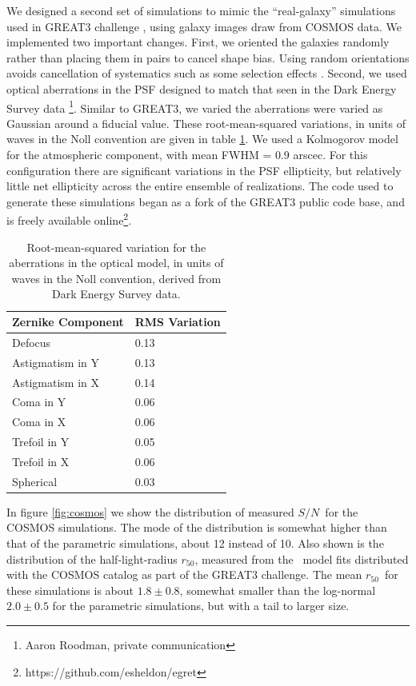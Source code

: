 \documentclass[usegraphicx,usenatbib]{mn2e}
\newcommand{\snr}{$S/N$}
\newcommand{\hlr}{$r_{50}$}
\begin{document}
We designed a second set of simulations to mimic the ``real-galaxy'' simulations
used in GREAT3 challenge \citep{great3}, using galaxy images draw from COSMOS
data.  We implemented two important changes.  First, we oriented the galaxies
randomly rather than placing them in pairs to cancel shape bias.  Using random
orientations avoids cancellation of systematics such as some selection effects
\citep{DESSVShear}.  Second, we used optical aberrations in the PSF designed to
match that seen in the Dark Energy Survey data \footnote{Aaron Roodman, private
communication}.  Similar to GREAT3, we varied the aberrations were varied as
Gaussian around a fiducial value. These root-mean-squared variations, in units
of waves in the Noll convention are given in table \ref{tab:aberr}.  We used a
Kolmogorov model for the atmospheric component, with mean FWHM = 0.9 arscec.
For this configuration there are significant variations in the PSF ellipticity,
but relatively little net ellipticity across the entire
ensemble of realizations.
The code used to generate these simulations began as a fork of the GREAT3
public code base, and is freely available
online\footnote{https://github.com/esheldon/egret}.

\begin{table}
    \centering
    \caption{Root-mean-squared variation for the aberrations in the optical model,
        in units of waves in the Noll convention, derived 
    from Dark Energy Survey data. \label{tab:aberr}}
    \begin{tabular}{ | l | l | }
        Zernike Component  & RMS Variation \\
        \hline
        Defocus & 0.13 \\
        Astigmatism in Y & 0.13 \\
        Astigmatism in X & 0.14 \\
        Coma in Y & 0.06 \\
        Coma in X & 0.06 \\
        Trefoil in Y & 0.05 \\
        Trefoil in X & 0.06 \\
        Spherical & 0.03 \\

    \end{tabular}
\end{table}

In figure \ref{fig:cosmos} we show the distribution of measured \snr\ for the
COSMOS simulations.  The mode of the distribution is somewhat higher than that
of the parametric simulations, about 12 instead of 10.  Also shown is the
distribution of the half-light-radius \hlr, measured
from the \sersic\ model fits distributed with the COSMOS catalog as part
of the GREAT3 challenge.  The mean \hlr\ for these simulations
is about $1.8 \pm 0.8$, somewhat smaller than the
log-normal $2.0 \pm 0.5$ for the parametric simulations, but with a tail to larger
size.
\end{document}

